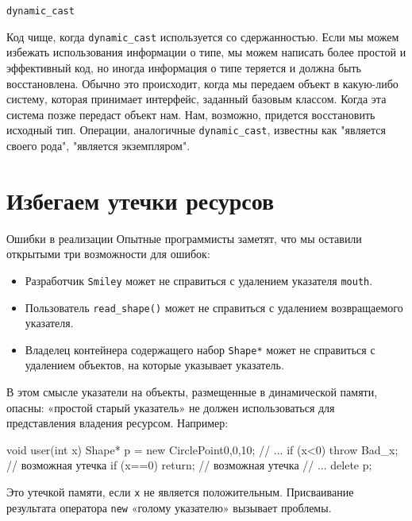\documentclass[
    8pt,
    hyperref={pdfencoding=unicode}
    ]{beamer}
\theoremstyle{definition}
\begin{document}
\begin{frame}[fragile]{\texttt{dynamic_cast}}
    
    Код чище, когда \texttt{dynamic_cast} используется со сдержанностью. Если мы можем избежать использования информации о 
    типе, мы можем написать более простой и эффективный код, но иногда информация о типе теряется и должна быть восстановлена. Обычно 
    это происходит, когда мы передаем объект в какую-либо систему, которая принимает интерфейс, заданный базовым классом. Когда эта 
    система позже передаст объект нам. Нам, возможно, придется восстановить исходный тип. Операции, аналогичные 
    \texttt{dynamic_cast}, известны как "является своего рода", "является экземпляром".
\end{frame}

\section{Избегаем утечки ресурсов}
\begin{frame}[fragile]{Ошибки в реализации}
    Опытные программисты заметят, что мы оставили открытыми три возможности для ошибок:
    \begin{itemize}
        \item Разработчик \texttt{Smiley} может не справиться с удалением указателя  \texttt{mouth}.
        \item Пользователь \texttt{read_shape()} может не справиться с удалением возвращаемого указателя.
        \item Владелец контейнера содержащего набор \texttt{Shape*} может не справиться с удалением объектов, на которые указывает указатель.
    \end{itemize}

    В этом смысле указатели на объекты, размещенные в динамической памяти, опасны: «простой старый указатель» не должен использоваться для представления владения ресурсом. Например:
    
    \begin{cppcode}
        void user(int x)
        {
            Shape* p = new Circle{Point{0,0},10};
            // ...
            if (x<0) throw Bad_x{}; // возможная утечка
            if (x==0) return; // возможная утечка
            // ...
            delete p;
        }
    \end{cppcode}

    Это утечкой памяти, если \texttt{x} не является положительным. 
    Присваивание результата оператора \texttt{new} «голому указателю» вызывает проблемы.
\end{frame}
\end{document}
